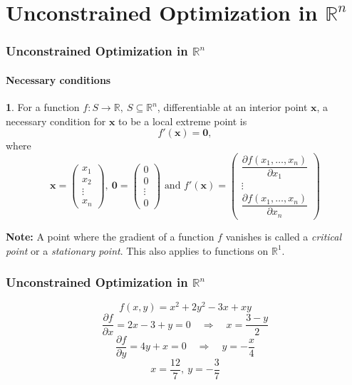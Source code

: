 \documentclass[10pt]{beamer}
\theoremstyle{definition}
\newtheorem{Fact}{\translate{Fact}}
\begin{document}
\section{Unconstrained Optimization in $ \mathbb{R}^n $}\label{sec:Rn}

\begin{frame}[fragile]
\frametitle{Unconstrained Optimization in $ \mathbb{R}^n $}
\framesubtitle{Necessary conditions}
\begin{Fact}
For a function $ f: S \rightarrow \mathbb{R},~ S \subseteq \mathbb{R}^n$, differentiable at an interior point $ \mathbf{x} $, a necessary condition for $ \mathbf{x} $ to be a local extreme point is \[ f'(\mathbf{x}) = \mathbf{0}, \]
where \[ \mathbf{x} = \left( \begin{array}{c}
x_1 \\
x_2\\
\vdots \\
x_n
\end{array}\right),~\mathbf{0} = \left( \begin{array}{c}
0 \\
0 \\
\vdots \\
0
\end{array}\right)\text{ and }  f'(\mathbf{x}) = \left( \begin{array}{c}
\dfrac{\partial f(x_1,\ldots,x_n)}{\partial x_1}\\
\vdots \\
\dfrac{\partial f(x_1,\ldots,x_n)}{\partial x_n}
\end{array}\right) \]
\label{fc:NCsRn}
\end{Fact}

\textbf{Note:} A point where the gradient of a function $ f $ vanishes is called a \emph{critical point} or a \emph{stationary point}. This also applies to functions on $ \mathbb{R}^1 $.
\end{frame}

\begin{frame}[fragile]
\frametitle{Unconstrained Optimization in $ \mathbb{R}^n $}
\begin{example}
\[ f(x,y) = x^2 +2y^2-3x+xy \]
\[ \frac{\partial f}{\partial x} = 2x-3+y=0\quad \Rightarrow \quad x=\frac{3-y}{2} \]
\[ \frac{\partial f}{\partial y} = 4y+x = 0\quad \Rightarrow \quad y = -\frac{x}{4}\]
\[ x=\frac{12}{7},~y=-\frac{3}{7} \]
\end{example}
\end{frame}
\end{document}
